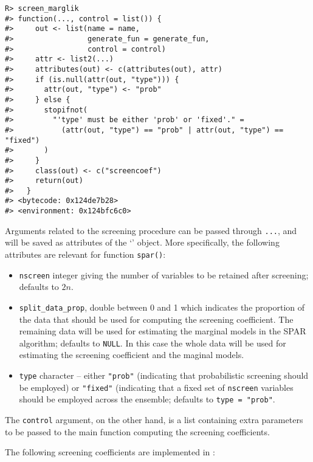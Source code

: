 \documentclass[
  article]{jss}
\newcommand{\class}[1]{`\code{#1}'}
\begin{document}
\begin{verbatim}
R> screen_marglik
#> function(..., control = list()) {
#>     out <- list(name = name,
#>                 generate_fun = generate_fun,
#>                 control = control)
#>     attr <- list2(...)
#>     attributes(out) <- c(attributes(out), attr)
#>     if (is.null(attr(out, "type"))) {
#>       attr(out, "type") <- "prob"
#>     } else {
#>       stopifnot(
#>         "'type' must be either 'prob' or 'fixed'." =
#>           (attr(out, "type") == "prob" | attr(out, "type") == "fixed")
#>       )
#>     }
#>     class(out) <- c("screencoef")
#>     return(out)
#>   }
#> <bytecode: 0x124de7b28>
#> <environment: 0x124bfc6c0>
\end{verbatim}

Arguments related to the screening procedure can be passed through
\texttt{...}, and will be saved as attributes of the \class{screencoef}
object. More specifically, the following attributes are relevant for
function \texttt{spar()}:

\begin{itemize}
\item
  \texttt{nscreen} integer giving the number of variables to be retained
  after screening; defaults to \(2n\).
\item
  \texttt{split\_data\_prop}, double between 0 and 1 which indicates the
  proportion of the data that should be used for computing the screening
  coefficient. The remaining data will be used for estimating the
  marginal models in the SPAR algorithm; defaults to \texttt{NULL}. In
  this case the whole data will be used for estimating the screening
  coefficient and the maginal models.
\item
  \texttt{type} character -- either \texttt{"prob"} (indicating that
  probabilistic screening should be employed) or \texttt{"fixed"}
  (indicating that a fixed set of \texttt{nscreen} variables should be
  employed across the ensemble; defaults to \texttt{type\ =\ "prob"}.
\end{itemize}

The \texttt{control} argument, on the other hand, is a list containing
extra parameters to be passed to the main function computing the
screening coefficients.

The following screening coefficients are implemented in :
\end{document}
